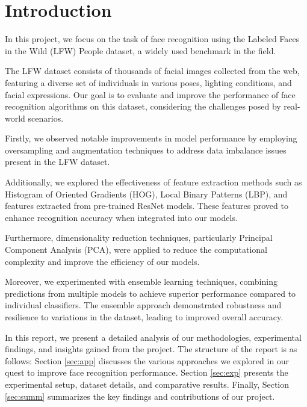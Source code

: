 \documentclass[a4paper]{article}
\theoremstyle{plain}
\theoremstyle{definition}
\begin{document}
	\tableofcontents
	
	\section{Introduction}
	\label{sec:intro}

 
In this project, we focus on the task of face recognition using the Labeled Faces in the Wild (LFW) People dataset, a widely used benchmark in the field.

The LFW dataset consists of thousands of facial images collected from the web, featuring a diverse set of individuals in various poses, lighting conditions, and facial expressions. Our goal is to evaluate and improve the performance of face recognition algorithms on this dataset, considering the challenges posed by real-world scenarios.

Firstly, we observed notable improvements in model performance by employing oversampling and augmentation techniques to address data imbalance issues present in the LFW dataset.

Additionally, we explored the effectiveness of feature extraction methods such as Histogram of Oriented Gradients (HOG), Local Binary Patterns (LBP), and features extracted from pre-trained ResNet models. These features proved to enhance recognition accuracy when integrated into our models.

Furthermore, dimensionality reduction techniques, particularly Principal Component Analysis (PCA), were applied to reduce the computational complexity and improve the efficiency of our models.

Moreover, we experimented with ensemble learning techniques, combining predictions from multiple models to achieve superior performance compared to individual classifiers. The ensemble approach demonstrated robustness and resilience to variations in the dataset, leading to improved overall accuracy.

In this report, we present a detailed analysis of our methodologies, experimental findings, and insights gained from the project. The structure of the report is as follows: Section \ref{sec:app} discusses the various approaches we explored in our quest to improve face recognition performance. Section \ref{sec:exp} presents the experimental setup, dataset details, and comparative results. Finally, Section \ref{sec:summ} summarizes the key findings and contributions of our project.
	

 \newpage
\end{document}
